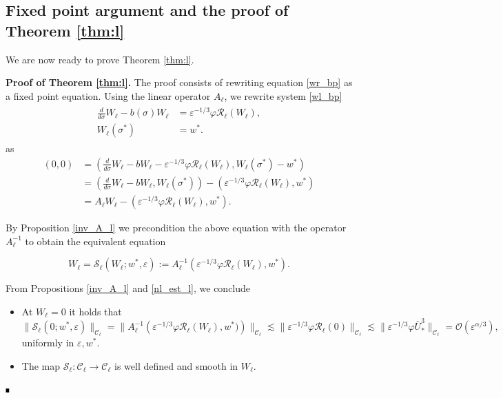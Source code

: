 \documentclass[letterpaper,11pt]{article}
\newcommand{\Ral}{\mathcal{R}}
\newcommand{\rmO}{\mathcal{O}}
\newcommand{\eps}{\varepsilon}
\newcommand{\lar}{ \lesssim }
\numberwithin{equation}{section}
\theoremstyle{plain}
\newenvironment{Proof}[1][.]%
 {\begin{trivlist}\item[]\textbf{Proof#1 }}%
 {\hspace*{\fill}$\rule{0.3\baselineskip}{0.35\baselineskip}$\end{trivlist}}
\begin{document}
\subsection{Fixed point argument and the proof of Theorem \ref{thm:l}}
We are now ready to prove Theorem \ref{thm:l}.
\begin{Proof}[ of Theorem \ref{thm:l}.]
The proof consists of rewriting equation \eqref{wr_bp} as a fixed point equation. Using the linear operator $A_\ell$, we rewrite system \eqref{wl_bp}
 \begin{align*}
\begin{split}
\frac{d}{d\sigma} W_\ell - b(\sigma)W_\ell &= \eps^{-1/3}\varphi \Ral_\ell(W_\ell),\\
W_\ell(\sigma^*) &= w^*.
\end{split}
\end{align*}
as
\begin{align*}
(0,0) &=\left( \frac{d}{d\sigma}W_\ell-b W_\ell - \eps^{-1/3}\varphi \Ral_\ell(W_\ell), W_\ell(\sigma^*)-w^* \right)\\
&=\left( \frac{d}{d\sigma}W_\ell-bW_\ell, W_\ell(\sigma^*) \right)- \left(\eps^{-1/3}\varphi \Ral_\ell(W_\ell), w^* \right)\\
&= A_\ell W_\ell - \left(\eps^{-1/3}\varphi \Ral_\ell(W_\ell), w^* \right).
\end{align*} 

By Proposition \ref{inv_A_l} we precondition the above equation with the operator $A_\ell^{-1}$ to obtain the equivalent equation

\begin{equation}\label{fix_pt:l}
 W_\ell = \mathcal{S}_\ell(W_\ell; w^*,\eps):= A_\ell^{-1}(\eps^{-1/3}\varphi \mathcal{R}_\ell(W_\ell), w^*).
\end{equation}

From Propositions \ref{inv_A_l} and \ref{nl_est_l}, we conclude 
\begin{itemize}
\item At $W_\ell =0 $ it holds that 
\[
\|\mathcal{S}_\ell(0; w^*,\eps) \|_{\mathcal{C}_\ell}= \|A_\ell^{-1}\left(\eps^{-1/3}\varphi \mathcal{R}_\ell(W_\ell),w^*)\right)\|_{\mathcal{C}_\ell}  \lar \|\eps^{-1/3}\varphi \Ral_\ell(0)\|_{\mathcal{C}_\ell} \lar \|\eps^{-1/3}\varphi \bar{U}_*^3 \|_{\mathcal{C}_\ell}=\rmO(\eps^{\alpha/3}),
\]
uniformly in $\eps,w^*$.

\item The map $\mathcal{S}_\ell: \mathcal{C}_\ell \to \mathcal{C}_\ell$ is well defined and smooth in $W_\ell$.


\end{itemize}
\end{Proof}
\end{document}
